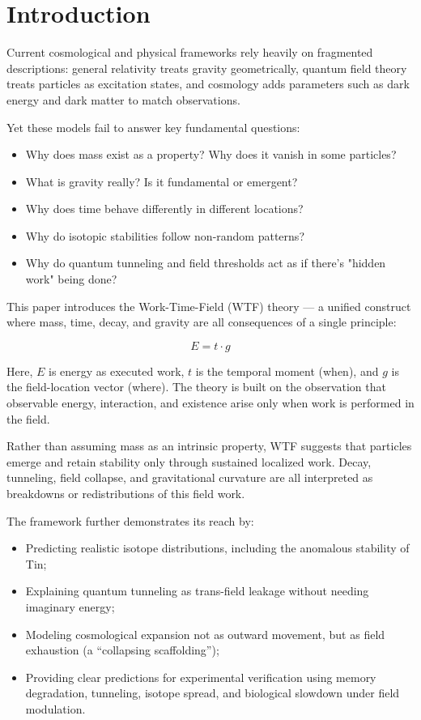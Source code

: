 \section{Introduction}

Current cosmological and physical frameworks rely heavily on fragmented descriptions: general relativity treats gravity geometrically, quantum field theory treats particles as excitation states, and cosmology adds parameters such as dark energy and dark matter to match observations.

Yet these models fail to answer key fundamental questions:
\begin{itemize}
    \item Why does mass exist as a property? Why does it vanish in some particles?
    \item What is gravity really? Is it fundamental or emergent?
    \item Why does time behave differently in different locations?
    \item Why do isotopic stabilities follow non-random patterns?
    \item Why do quantum tunneling and field thresholds act as if there's "hidden work" being done?
\end{itemize}

This paper introduces the Work-Time-Field (WTF) theory --- a unified construct where mass, time, decay, and gravity are all consequences of a single principle:

\[
E = t \cdot g
\]

Here, \( E \) is energy as executed work, \( t \) is the temporal moment (when), and \( g \) is the field-location vector (where). The theory is built on the observation that observable energy, interaction, and existence arise only when work is performed in the field.

Rather than assuming mass as an intrinsic property, WTF suggests that particles emerge and retain stability only through sustained localized work. Decay, tunneling, field collapse, and gravitational curvature are all interpreted as breakdowns or redistributions of this field work.

The framework further demonstrates its reach by:
\begin{itemize}
    \item Predicting realistic isotope distributions, including the anomalous stability of Tin;
    \item Explaining quantum tunneling as trans-field leakage without needing imaginary energy;
    \item Modeling cosmological expansion not as outward movement, but as field exhaustion (a “collapsing scaffolding”);
    \item Providing clear predictions for experimental verification using memory degradation, tunneling, isotope spread, and biological slowdown under field modulation.
\end{itemize}
